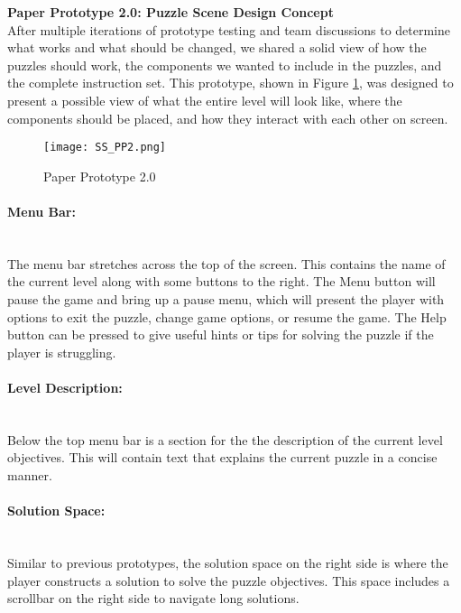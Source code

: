 \textbf{Paper Prototype 2.0: Puzzle Scene Design Concept}\\
After multiple iterations of prototype testing and team discussions to determine what works and 
what should be changed, we shared a solid view of how the puzzles should work, the components 
we wanted to include in the puzzles, and the complete instruction set. This prototype, shown in 
Figure \ref{fig:Paper_Prototype_2.0}, was designed to present a possible view of what the entire 
level will look like, where the components should be placed, and how they interact with each 
other on screen.\\

\begin{figure}[H]
	\caption{Paper Prototype 2.0}
	\label{fig:Paper_Prototype_2.0}
	\centering
	\texttt{[image: SS\_PP2.png]}
\end{figure}


\paragraph{Menu Bar:} ~\\
The menu bar stretches across the top of the screen. This contains the name of the current level 
along with some buttons to the right. The Menu button will pause the game and bring up a pause 
menu, which will present the player with options to exit the puzzle, change game options, or resume 
the game. The Help button can be pressed to give useful hints or tips for solving the puzzle if the 
player is struggling.\\

\paragraph{Level Description:} ~\\
Below the top menu bar is a section for the the description of the current level objectives. This will 
contain text that explains the current puzzle in a concise manner.\\

\paragraph{Solution Space:} ~\\
Similar to previous prototypes, the solution space on the right side is where the player constructs 
a solution to solve the puzzle objectives. This space includes a scrollbar on the right side to 
navigate long solutions.\\

